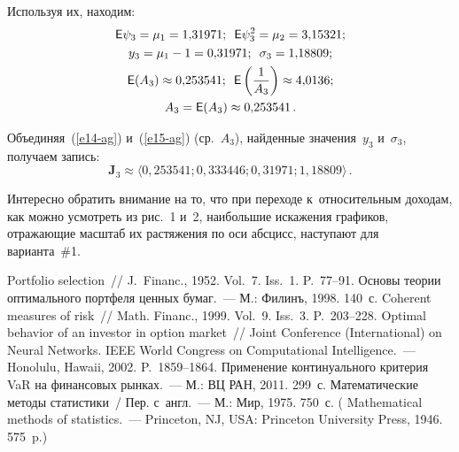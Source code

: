 \begin{multicols}{2}
  Используя их, находим:
  \begin{gather*}
  {\sf E}\psi_3=\mu_1 = 1{,}31971;\enskip
  {\sf E}\psi_3^2 = \mu_2 = 3{,}15321;\\
  y_3 = \mu_1 - 1 = 0{,}31971;\enskip  \sigma_3 = 1{,}18809; \\
  {\sf E}(A_3) \approx 0{,}253541;\enskip {\sf E}\left(\displaystyle\frac{\displaystyle 1\mathstrut}{\displaystyle A_3\mathstrut}\right) \approx 4{,}0136; \\
   A_3 = {\sf E}(A_3) \approx 0{,}253541\,. 
  \end{gather*}
  
  Объединяя~(\ref{e14-ag}) и~(\ref{e15-ag}) (ср.~$A_3$), найденные 
значения~$y_3$ и~$\sigma_3$, получаем запись: 
  $$
  \mathbf{J}_3\approx \langle 0{,}253541; 0{,}333446; 0{,}31971; 
1{,}18809\rangle\,. 
  $$
  
  Интересно обратить внимание на то, что при переходе к~относительным 
доходам, как можно усмотреть из рис.~1 и~2, наибольшие искажения графиков, 
отражающие масштаб их растяжения по оси абсцисс, наступают для 
варианта~\#1. 
   
{\small\frenchspacing
 {%
 \begin{thebibliography}{9}
   Portfolio selection~// J.~Financ., 1952. Vol.~7. Iss.~1. P.~77--91.
   Основы теории оптимального портфеля ценных бумаг.~--- М.: 
Филинъ, 1998. 140~с.
   Coherent measures of risk~// Math. 
Financ., 1999. Vol.~9. Iss.~3. P.~203--228.
   Optimal behavior of an investor in option market~// Joint Conference 
(International) on Neural Networks. IEEE World Congress on Computational Intelligence.~--- 
Honolulu, Hawaii, 2002. P.~1859--1864. 
   Применение континуального критерия VaR на финансовых 
рынках.~--- М.: ВЦ РАН, 2011. 299~с. 
   Математические методы статистики~/ Пер. с~англ.~--- М.: Мир, 1975. 
750~с. ( Mathematical methods of statistics.~--- Princeton, NJ, USA: Princeton 
University Press, 1946. 575~p.)

 \end{thebibliography}

 }
 }

\end{multicols}

\vspace*{-6pt}

